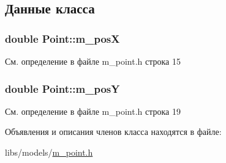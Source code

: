 \subsection{Данные класса}
\hypertarget{class_point_a6bc233f75b7f95673756301323bc7e82}{
\subsubsection[{m\-\_\-pos\-X}]{\setlength{\rightskip}{0pt plus 5cm}double Point\-::m\-\_\-pos\-X\hspace{0.3cm}{\ttfamily [private]}}}\label{class_point_a6bc233f75b7f95673756301323bc7e82}


См. определение в файле m\-\_\-point.\-h строка 15

\hypertarget{class_point_a9cf23d4ad95854a89a4b0228f4cd7290}{
\subsubsection[{m\-\_\-pos\-Y}]{\setlength{\rightskip}{0pt plus 5cm}double Point\-::m\-\_\-pos\-Y\hspace{0.3cm}{\ttfamily [private]}}}\label{class_point_a9cf23d4ad95854a89a4b0228f4cd7290}


См. определение в файле m\-\_\-point.\-h строка 19



Объявления и описания членов класса находятся в файле\-:\begin{DoxyCompactItemize}
\item 
libs/models/\hyperlink{m__point_8h}{m\-\_\-point.\-h}\end{DoxyCompactItemize}
